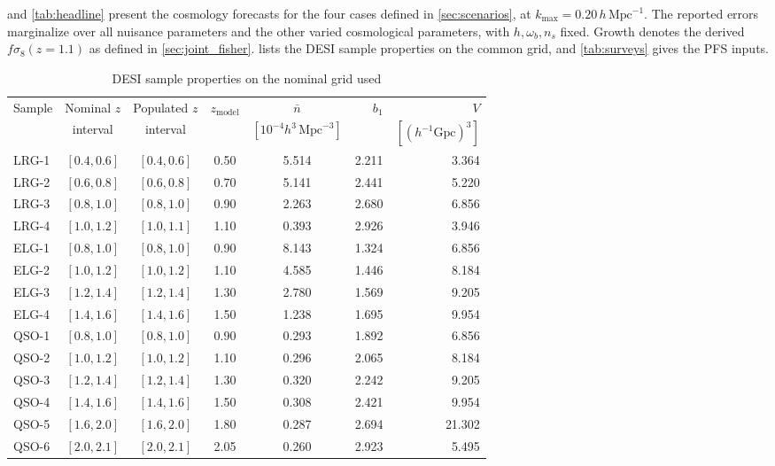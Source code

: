 \documentclass[a4paper,11pt]{article}
\newcommand{\revchange}[1]{{\color{RevisionColor}#1}}
\def\iMpch{\,h\,\mathrm{Mpc}^{-1}}
\def\kmax{k_{\mathrm{max}}}
\newcommand{\se}{\ensuremath{\sigma_{8}}\xspace}
\newcommand{\nbar}{\bar{n}}
\begin{document}
\revchange{ and \cref{tab:headline} present the
cosmology forecasts for the four cases defined in \cref{sec:scenarios},
at $\kmax=0.20\iMpch$. The reported errors marginalize over
all nuisance parameters and the other varied cosmological parameters,
with $h,\omega_b,n_s$ fixed. Growth denotes the derived
$f\se(z=1.1)$ as defined in \cref{sec:joint_fisher}.
\Cref{tab:dr2_samples} lists the DESI sample properties on the
common grid, and \cref{tab:surveys} gives the PFS inputs.}

\begin{table}[t]
\centering\color{RevisionColor}
\small
\setlength{\tabcolsep}{4pt}
\begin{tabular}{lccccrr}
\hline
Sample & Nominal $z$ & Populated $z$ & $z_{\mathrm{model}}$ & $\nbar$ & $b_1$ & $V$ \\
 & interval & interval & & $[10^{-4}h^3\,\mathrm{Mpc}^{-3}]$ & & $[(h^{-1}\mathrm{Gpc})^3]$ \\
\hline
LRG-1 & $[0.4,0.6]$ & $[0.4,0.6]$ & 0.50 & 5.514 & 2.211 & 3.364 \\
LRG-2 & $[0.6,0.8]$ & $[0.6,0.8]$ & 0.70 & 5.141 & 2.441 & 5.220 \\
LRG-3 & $[0.8,1.0]$ & $[0.8,1.0]$ & 0.90 & 2.263 & 2.680 & 6.856 \\
LRG-4 & $[1.0,1.2]$ & $[1.0,1.1]$ & 1.10 & 0.393 & 2.926 & 3.946 \\
ELG-1 & $[0.8,1.0]$ & $[0.8,1.0]$ & 0.90 & 8.143 & 1.324 & 6.856 \\
ELG-2 & $[1.0,1.2]$ & $[1.0,1.2]$ & 1.10 & 4.585 & 1.446 & 8.184 \\
ELG-3 & $[1.2,1.4]$ & $[1.2,1.4]$ & 1.30 & 2.780 & 1.569 & 9.205 \\
ELG-4 & $[1.4,1.6]$ & $[1.4,1.6]$ & 1.50 & 1.238 & 1.695 & 9.954 \\
QSO-1 & $[0.8,1.0]$ & $[0.8,1.0]$ & 0.90 & 0.293 & 1.892 & 6.856 \\
QSO-2 & $[1.0,1.2]$ & $[1.0,1.2]$ & 1.10 & 0.296 & 2.065 & 8.184 \\
QSO-3 & $[1.2,1.4]$ & $[1.2,1.4]$ & 1.30 & 0.320 & 2.242 & 9.205 \\
QSO-4 & $[1.4,1.6]$ & $[1.4,1.6]$ & 1.50 & 0.308 & 2.421 & 9.954 \\
QSO-5 & $[1.6,2.0]$ & $[1.6,2.0]$ & 1.80 & 0.287 & 2.694 & 21.302 \\
QSO-6 & $[2.0,2.1]$ & $[2.0,2.1]$ & 2.05 & 0.260 & 2.923 & 5.495 \\
\hline
\end{tabular}
\caption{\color{RevisionColor}DESI sample properties on the nominal grid used
}
\end{table}
\end{document}
